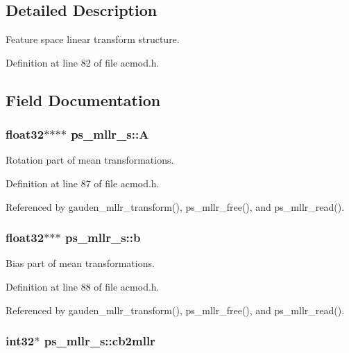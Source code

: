 \subsection{Detailed Description}
Feature space linear transform structure. 

Definition at line 82 of file acmod.\-h.



\subsection{Field Documentation}
\subsubsection[{A}]{\setlength{\rightskip}{0pt plus 5cm}float32$\ast$$\ast$$\ast$$\ast$ ps\-\_\-mllr\-\_\-s\-::\-A}\label{structps__mllr__s_a4cfa5d4c6637282b947b525a673cc3d0}


Rotation part of mean transformations. 



Definition at line 87 of file acmod.\-h.



Referenced by gauden\-\_\-mllr\-\_\-transform(), ps\-\_\-mllr\-\_\-free(), and ps\-\_\-mllr\-\_\-read().

\subsubsection[{b}]{\setlength{\rightskip}{0pt plus 5cm}float32$\ast$$\ast$$\ast$ ps\-\_\-mllr\-\_\-s\-::b}\label{structps__mllr__s_a65430ba654d0af5e508715de24077f2d}


Bias part of mean transformations. 



Definition at line 88 of file acmod.\-h.



Referenced by gauden\-\_\-mllr\-\_\-transform(), ps\-\_\-mllr\-\_\-free(), and ps\-\_\-mllr\-\_\-read().

\subsubsection[{cb2mllr}]{\setlength{\rightskip}{0pt plus 5cm}int32$\ast$ ps\-\_\-mllr\-\_\-s\-::cb2mllr}\label{structps__mllr__s_a745c4b69be55cef8629abab02f474bb9}


